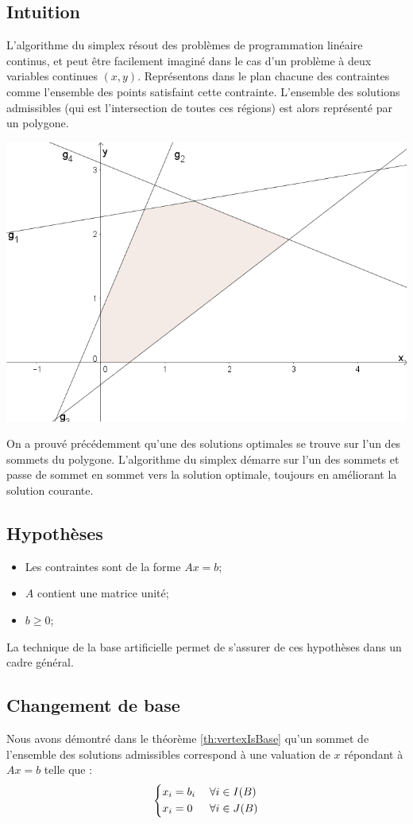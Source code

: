 \documentclass[a4paper]{report}
\theoremstyle{definition}
\theoremstyle{remark}
\theoremstyle{plain}
\begin{document}
\subsection{Intuition}
L'algorithme du simplex résout des problèmes de programmation linéaire continus,
et peut être facilement imaginé dans le cas d'un problème à deux variables
continues \((x,y)\). Représentons dans le plan chacune des contraintes comme
l'ensemble des points satisfaint cette contrainte. L'ensemble des solutions
admissibles (qui est l'intersection de toutes ces régions) est alors représenté
par un polygone.
\begin{center}\textbf{\textbf{}}
\includegraphics[width=\textwidth]{simplex-xy.png}
\end{center}
On a prouvé précédemment qu'une des solutions optimales se trouve sur l'un des
sommets du polygone. L'algorithme du simplex démarre sur l'un des sommets et
passe de sommet en sommet vers la solution optimale, toujours en améliorant la
solution courante.

\subsection{Hypothèses}
\begin{itemize}
	\item Les contraintes sont de la forme \(Ax=b\);
	\item \(A\) contient une matrice unité;
	\item \(b\ge 0\);
\end{itemize}
La technique de la base artificielle permet de s'assurer de ces hypothèses
dans un cadre général.

\subsection{Changement de base}
Nous avons démontré dans le théorème \ref{th:vertexIsBase} qu'un sommet de
l'ensemble des solutions admissibles correspond à une valuation de $x$ répondant
à $Ax = b$ telle que :
\[\begin{dcases}
	x_i = b_i\;&\forall i \in I(B) \\
	x_i = 0&\forall i \in J(B)
\end{dcases}\]
\end{document}
